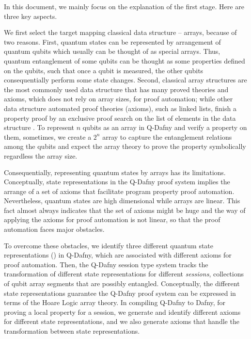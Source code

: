 In this document, we mainly focus on the explanation of the first stage. Here are three key aspects.

We first select the target mapping classical data structure -- arrays, because of two reasons.
First, quantum states can be represented by arrangement of quantum qubits which usually can be thought of as special arrays.
Thus, quantum entanglement of some qubits can be thought as some properties defined on the qubits, 
such that once a qubit is measured, the other qubits consequentially perform some state changes.
Second, classical array structures are the most commonly used data structure 
that has many proved theories and axioms, which does not rely on array sizes, for proof automation;
while other data structure automated proof theories (axioms), such as linked lists, 
finish a property proof by an exclusive proof search on the list of elements in the data structure \cite{DBLP:conf/pldi/Qiu0SM13}.
To represent $n$ qubits as an array in Q-Dafny and verify a property on them, sometimes,
we create a $2^n$ array to capture the entanglement relations among the qubits
and expect the array theory to prove the property symbolically regardless the array size.

Consequentially, representing quantum states by arrays has its limitations.
Conceptually, state representations in the Q-Dafny proof system
implies the arrange of a set of axioms that facilitate program property proof automation.
Nevertheless, quantum states are high dimensional while arrays are linear.
This fact almost always indicates that the set of axioms might be huge 
and the way of applying the axioms for proof automation is not linear,
so that the proof automation faces major obstacles. 

To overcome these obstacles, we identify three different quantum state representations () in Q-Dafny, 
which are associated with different axioms for proof automation.
Then, the Q-Dafny session type system tracks the transformation of different state 
representations for different \textit{sessions}, collections of qubit array segments that are possibly entangled.
Conceptually, the different state representations guarantee the Q-Dafny proof system can be expressed
in terms of the Hoare Logic array theory.
In compiling Q-Dafny to Dafny,
for proving a local property for a session, we generate and identify different axioms for different state representations,
and we also generate axioms that handle the transformation between state representations.

